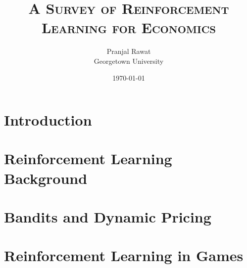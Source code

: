 %
%





\title{\textsc{A Survey of Reinforcement Learning for Economics}}
\author{Pranjal Rawat \\ Georgetown University}
\date{\today}

\maketitle

\begin{abstract}
\noindent

\end{abstract}

\tableofcontents
\newpage


\section{Introduction}\label{section:intro}


\section{Reinforcement Learning Background}\label{section:rl_background}


\section{Bandits and Dynamic Pricing}\label{section:bandits}


\section{Reinforcement Learning in Games}\label{section:rl_games}


